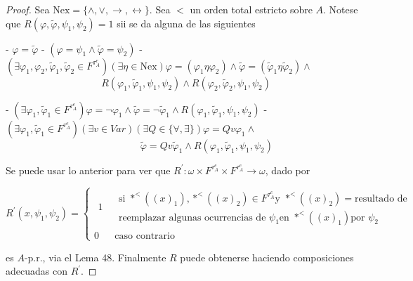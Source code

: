   \begin{proof}
    Sea $\mathrm{Nex}=\{\wedge ,\vee ,\rightarrow ,\leftrightarrow \}$. Sea $< $ un orden total estricto sobre $A$. Notese que $R(\varphi ,\tilde{\varphi} ,\psi_{1},\psi_{2})=1$ sii se da alguna de las siguientes

    - $\varphi =\tilde{\varphi}$
    - $(\varphi =\psi_{1}\wedge \tilde{\varphi}=\psi_{2})$
    - $(\exists \varphi _{1},\varphi _{2},\tilde{\varphi}_{1},\tilde{ \varphi}_{2}\in F^{\tau_{A}^{e}})(\exists \eta \in \mathrm{Nex})\varphi =(\varphi _{1}\eta \varphi _{2})\wedge \tilde{\varphi}=(\tilde{\varphi} _{1}\eta \tilde{\varphi}_{2})\wedge $
    $\;\;\;\;\;\;\;\;\;\;\;\;\;\;\;\;\;\;\;\;\;\;\;\;\;\;\;\;\;\;\;\;\;\;\;R( \varphi _{1},\tilde{\varphi}_{1},\psi_{1},\psi_{2})\wedge R(\varphi _{2}, \tilde{\varphi}_{2},\psi_{1},\psi_{2})$

    - $(\exists \varphi _{1},\tilde{\varphi}_{1}\in F^{\tau_{A}^{e}})\varphi =\lnot \varphi _{1}\wedge \tilde{\varphi}=\lnot \tilde{ \varphi}_{1}\wedge R(\varphi _{1},\tilde{\varphi}_{1},\psi_{1},\psi_{2})$
    - $(\exists \varphi _{1},\tilde{\varphi}_{1}\in F^{\tau_{A}^{e}})(\exists v\in Var)(\exists Q\in \{\forall ,\exists \})\varphi =Qv\varphi _{1}\wedge $
    $\ \ \ \ \ \ \ \ \ \ \ \ \ \ \ \ \ \ \ \ \ \ \ \ \ \ \ \ \ \ \ \ \ \ \ \ \ \ \ \ \ \ \ \ \ \ \ \ \ \ \ \ \ \ \ \ \ \ \ \ \ \ \tilde{\varphi}=Qv\tilde{ \varphi}_{1}\wedge R(\varphi _{1},\tilde{\varphi}_{1},\psi_{1},\psi_{2})$

    Se puede usar lo anterior para ver que $R^{\prime }:\omega \times F^{\tau_{A}^{e}}\times F^{\tau_{A}^{e}}\rightarrow \omega $, dado por

    $\displaystyle R^{\prime }(x,\psi_{1},\psi_{2})=\left\{ \begin{array}{cc} \begin{array}{c} 1 \\ \; \end{array} & \begin{array}{c} \text{si }\ast ^{< }((x)_{1}),\ast ^{< }((x)_{2})\in F^{\tau_{A}^{e}}\text{y }\ast ^{< }((x)_{2})=\text{resultado de} \\ \text{reemplazar algunas ocurrencias de }\psi_{1}\text{en }\ast ^{< }((x)_{1})\text{por }\psi_{2} \end{array} \\ 0 & \text{caso contrario} \end{array} \right. $

    es $A$-p.r., via el Lema 48. Finalmente $R$ puede obtenerse haciendo composiciones adecuadas con $R^{\prime }$.
  \end{proof}

